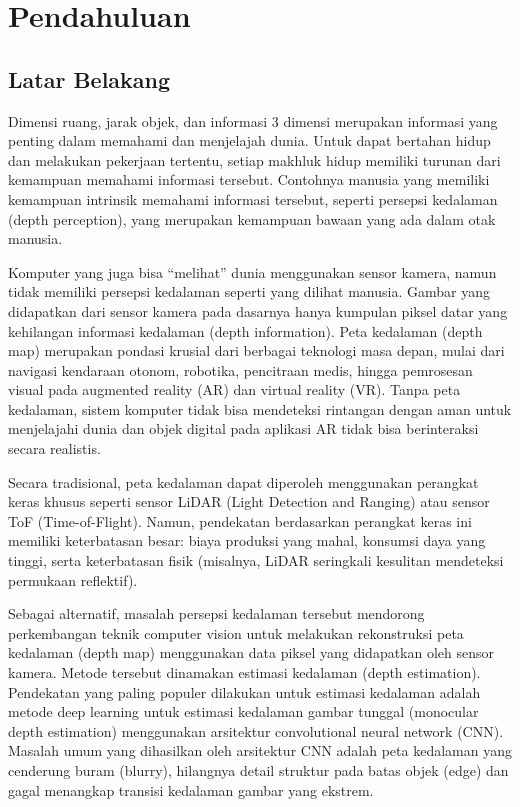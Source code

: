 \chapter{Pendahuluan}

\section{Latar Belakang}
Dimensi ruang, jarak objek, dan informasi 3 dimensi  merupakan informasi yang penting dalam memahami dan menjelajah dunia. 
Untuk dapat bertahan hidup dan melakukan pekerjaan tertentu, setiap makhluk hidup memiliki turunan dari kemampuan memahami informasi tersebut. 
Contohnya manusia yang memiliki kemampuan intrinsik memahami informasi tersebut, seperti persepsi kedalaman (depth perception), yang merupakan kemampuan bawaan yang ada dalam otak manusia.

Komputer yang juga bisa “melihat” dunia menggunakan sensor kamera, namun tidak memiliki persepsi kedalaman seperti yang dilihat manusia. 
Gambar yang didapatkan dari sensor kamera pada dasarnya hanya kumpulan piksel datar yang kehilangan informasi kedalaman (depth information). 
Peta kedalaman (depth map) merupakan pondasi krusial dari berbagai teknologi masa depan, mulai dari navigasi kendaraan otonom, robotika, pencitraan medis, hingga pemrosesan visual pada augmented reality (AR) dan virtual reality (VR). 
Tanpa peta kedalaman, sistem komputer tidak bisa mendeteksi rintangan dengan aman untuk menjelajahi dunia dan objek digital pada aplikasi AR tidak bisa berinteraksi secara realistis.

Secara tradisional, peta kedalaman dapat diperoleh menggunakan perangkat keras khusus seperti sensor LiDAR (Light Detection and Ranging) atau sensor ToF (Time-of-Flight). 
Namun, pendekatan berdasarkan perangkat keras ini memiliki keterbatasan besar: biaya produksi yang mahal, konsumsi daya yang tinggi, serta keterbatasan fisik (misalnya, LiDAR seringkali kesulitan mendeteksi permukaan reflektif).

Sebagai alternatif, masalah persepsi kedalaman tersebut mendorong perkembangan teknik computer vision untuk melakukan rekonstruksi peta kedalaman (depth map) menggunakan data piksel yang didapatkan oleh sensor kamera. Metode tersebut dinamakan estimasi kedalaman (depth estimation). Pendekatan yang paling populer dilakukan untuk estimasi kedalaman adalah metode deep learning untuk estimasi kedalaman gambar tunggal (monocular depth estimation) menggunakan arsitektur convolutional neural network (CNN). Masalah umum yang dihasilkan oleh arsitektur CNN adalah peta kedalaman yang cenderung buram (blurry), hilangnya detail struktur pada batas objek (edge) dan gagal menangkap transisi kedalaman gambar yang ekstrem.

